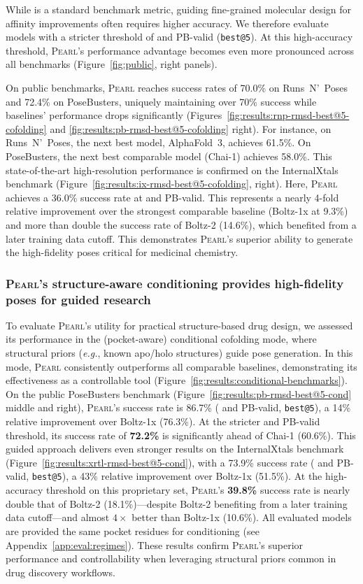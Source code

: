 \documentclass[11pt, letterpaper, onecolumn]{tau-class/tau}
\makeatletter
\newcommand{\pearl}{\textsc{Pearl}\xspace}
\newcommand{\alphafold}[1]{AlphaFold~#1\xspace}
\newcommand{\boltz}[1]{\mbox{Boltz-#1\xspace}}
\newcommand{\chai}[1]{\mbox{Chai-#1\xspace}}
\newcommand{\best}[1]{\texttt{best@#1}\xspace}
\newcommand{\rmsdonea}{\text{RMSD\,\raisebox{0.25ex}{\scriptsize <}\,1\,\AA}\xspace}
\newcommand{\rmsdtwoa}{\text{RMSD\,\raisebox{0.25ex}{\scriptsize <}\,2\,\AA}\xspace}
\newcommand{\runsnposes}{Runs~N'~Poses\xspace}
\newcommand{\posebusters}{PoseBusters\xspace}
\newcommand{\internalxtals}{InternalXtals\xspace}
\newcommand{\eg}{\textit{e.g.}\xspace}
\let\oldAA\AA
\renewcommand{\AA}{\oldAA\xspace}
\makeatother
\begin{document}
While \rmsdtwoa is a standard benchmark metric, guiding fine-grained molecular design for affinity improvements often requires higher accuracy.
We therefore evaluate models with a stricter threshold of \rmsdonea and PB-valid (\best5).
At this high-accuracy threshold, \pearl's performance advantage becomes even more pronounced across all benchmarks (Figure~\ref{fig:public}, right panels).

On public benchmarks, \pearl reaches success rates of 70.0\% on \runsnposes and 72.4\% on \posebusters, uniquely maintaining over 70\% success while baselines' performance drops significantly (Figures~\ref{fig:results:rnp-rmsd-best@5-cofolding} and \ref{fig:results:pb-rmsd-best@5-cofolding} right). For instance, on \runsnposes, the next best model, \alphafold3, achieves 61.5\%.
On \posebusters, the next best comparable model (\chai1) achieves 58.0\%.
This state-of-the-art high-resolution performance is confirmed on the \internalxtals benchmark (Figure~\ref{fig:results:ix-rmsd-best@5-cofolding}, right).
Here, \pearl achieves a 36.0\% success rate at \rmsdonea and PB-valid. This represents a nearly 4-fold relative improvement over the strongest comparable baseline (\boltz1x at 9.3\%) and more than double the success rate of \boltz2 (14.6\%), which benefited from a later training data cutoff. This demonstrates \pearl's superior ability to generate the high-fidelity poses critical for medicinal chemistry.


\subsubsection{\pearl's structure-aware conditioning provides high-fidelity poses for guided research}
\label{sec:pocket}

To evaluate \pearl's utility for practical structure-based drug design, we assessed its performance in the (pocket-aware) conditional cofolding mode, where structural priors (\eg, known apo/holo structures) guide pose generation.
In this mode, \pearl consistently outperforms all comparable baselines, demonstrating its effectiveness as a controllable tool (Figure~\ref{fig:results:conditional-benchmarks}).
On the public \posebusters benchmark (Figure~\ref{fig:results:pb-rmsd-best@5-cond} middle and right), \pearl's success rate is 86.7\% (\rmsdtwoa and PB-valid, \best5), a 14\% relative improvement over \boltz1x (76.3\%).
At the stricter \rmsdonea and PB-valid threshold, its success rate of \textbf{72.2\%} is significantly ahead of \chai1 (60.6\%).
This guided approach delivers even stronger results on the \internalxtals benchmark (Figure~\ref{fig:results:xrtl-rmsd-best@5-cond}), with a 73.9\% success rate (\rmsdtwoa and PB-valid, \best5), a 43\% relative improvement over \boltz1x (51.5\%).
At the high-accuracy \rmsdonea threshold on this proprietary set, \pearl's \textbf{39.8\%} success rate is nearly double that of \boltz2 (18.1\%)---despite \boltz2 benefiting from a later training data cutoff---and almost $4\times$ better than \boltz1x (10.6\%).
All evaluated models are provided the same pocket residues for conditioning (see Appendix~\ref{app:eval:regimes}).
These results confirm \pearl's superior performance and controllability when leveraging structural priors common in drug discovery workflows.
\end{document}
